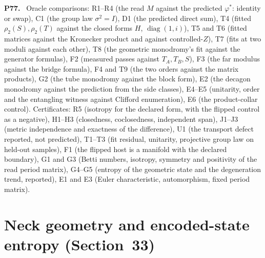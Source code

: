 \documentclass[11pt]{article}
\newenvironment{solution}[1]{\medskip\noindent\textbf{P#1.}\ }{\par\medskip}
\begin{document}
\begin{solution}{77}
Oracle comparisons: R1--R4 (the read $M$ against the predicted
$\varphi^*$: identity or swap), C1 (the group law $\sigma^2 = I$), D1 (the
predicted direct sum), T4 (fitted $\rho_2(S),\rho_2(T)$ against the closed
forms $H$, $\operatorname{diag}(1,i)$), T5 and T6 (fitted matrices against the
Kronecker product and against controlled-$Z$), T7 (fits at two moduli
against each other), T8 (the geometric monodromy's fit against the
generator formulas), F2 (measured passes against $T_A,T_B,S$), F3 (the far
modulus against the bridge formula), F4 and T9 (the two orders against the
matrix products), G2 (the tube monodromy against the block form), E2 (the
decagon monodromy against the prediction from the side classes), E4--E5
(unitarity, order and the entangling witness against Clifford
enumeration), E6 (the product-collar control). Certificates: R5 (isotropy
for the declared form, with the flipped control as a negative), H1--H3
(closedness, coclosedness, independent span), J1--J3 (metric independence
and exactness of the difference), U1 (the transport defect reported, not
predicted), T1--T3 (fit residual, unitarity, projective group law on held-out
samples), F1 (the flipped host is a manifold with the declared boundary),
G1 and G3 (Betti numbers, isotropy, symmetry and positivity of the read
period matrix), G4--G5 (entropy of the geometric state and the degeneration
trend, reported), E1 and E3 (Euler characteristic, automorphism, fixed
period matrix).
\end{solution}

\section*{Neck geometry and encoded-state entropy (Section~33)}
\end{document}
